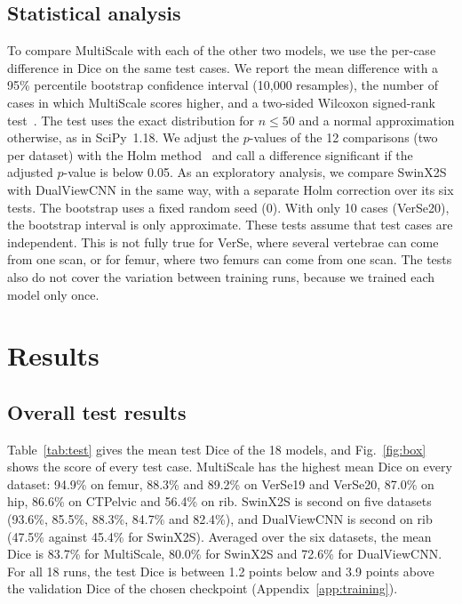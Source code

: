 \documentclass[11pt]{article}
\begin{document}
\subsection{Statistical analysis}
To compare MultiScale with each of the other two models, we use the per-case difference in Dice on the same test cases. We report the mean difference with a 95\% percentile bootstrap confidence interval (10,000 resamples), the number of cases in which MultiScale scores higher, and a two-sided Wilcoxon signed-rank test~\cite{wilcoxon1945}. The test uses the exact distribution for $n\le50$ and a normal approximation otherwise, as in SciPy~1.18. We adjust the $p$-values of the 12 comparisons (two per dataset) with the Holm method~\cite{holm1979} and call a difference significant if the adjusted $p$-value is below 0.05. As an exploratory analysis, we compare SwinX2S with DualViewCNN in the same way, with a separate Holm correction over its six tests. The bootstrap uses a fixed random seed (0). With only 10 cases (VerSe20), the bootstrap interval is only approximate. These tests assume that test cases are independent. This is not fully true for VerSe, where several vertebrae can come from one scan, or for femur, where two femurs can come from one scan. The tests also do not cover the variation between training runs, because we trained each model only once.

\section{Results}\label{sec:results}

\subsection{Overall test results}
Table~\ref{tab:test} gives the mean test Dice of the 18 models, and Fig.~\ref{fig:box} shows the score of every test case. MultiScale has the highest mean Dice on every dataset: 94.9\% on femur, 88.3\% and 89.2\% on VerSe19 and VerSe20, 87.0\% on hip, 86.6\% on CTPelvic and 56.4\% on rib. SwinX2S is second on five datasets (93.6\%, 85.5\%, 88.3\%, 84.7\% and 82.4\%), and DualViewCNN is second on rib (47.5\% against 45.4\% for SwinX2S). Averaged over the six datasets, the mean Dice is 83.7\% for MultiScale, 80.0\% for SwinX2S and 72.6\% for DualViewCNN. For all 18 runs, the test Dice is between 1.2 points below and 3.9 points above the validation Dice of the chosen checkpoint (Appendix~\ref{app:training}).
\end{document}
